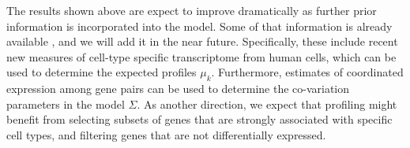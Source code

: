 \documentclass{article} %
\begin{document}
The results shown above are expect to improve dramatically as further prior information is incorporated into the model. Some of that information is already available \cite{darmanis2015survey}, and we will add it in the near future.  Specifically, these include recent new measures of cell-type specific transcriptome from human cells, which can be used to determine the expected profiles $\mu_k$. Furthermore, estimates of coordinated expression among gene pairs can be used to determine the co-variation parameters in the model $\Sigma$.
As another direction, we expect that profiling might benefit from selecting subsets of genes that are strongly associated with specific cell types, and filtering genes that are not differentially expressed.




\end{document}
